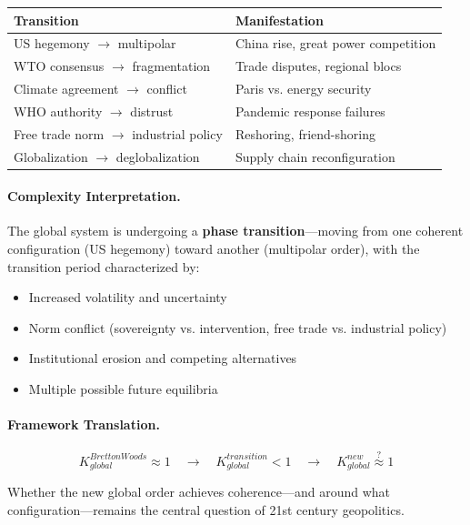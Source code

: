 \begin{center}
\renewcommand{\arraystretch}{1.3}
\begin{tabular}{|l|l|}
\hline
\textbf{Transition} & \textbf{Manifestation} \\
\hline
US hegemony $\to$ multipolar & China rise, great power competition \\
WTO consensus $\to$ fragmentation & Trade disputes, regional blocs \\
Climate agreement $\to$ conflict & Paris vs. energy security \\
WHO authority $\to$ distrust & Pandemic response failures \\
Free trade norm $\to$ industrial policy & Reshoring, friend-shoring \\
Globalization $\to$ deglobalization & Supply chain reconfiguration \\
\hline
\end{tabular}
\end{center}

\paragraph{Complexity Interpretation.}
The global system is undergoing a \textbf{phase transition}---moving from one
coherent configuration (US hegemony) toward another (multipolar order), with
the transition period characterized by:
\begin{itemize}
    \item Increased volatility and uncertainty
    \item Norm conflict (sovereignty vs. intervention, free trade vs. industrial policy)
    \item Institutional erosion and competing alternatives
    \item Multiple possible future equilibria
\end{itemize}

\paragraph{Framework Translation.}
\begin{equation}
K_{global}^{Bretton Woods} \approx 1 \quad \to \quad K_{global}^{transition} < 1
\quad \to \quad K_{global}^{new} \stackrel{?}{\approx} 1
\end{equation}

Whether the new global order achieves coherence---and around what
configuration---remains the central question of 21st century geopolitics.

